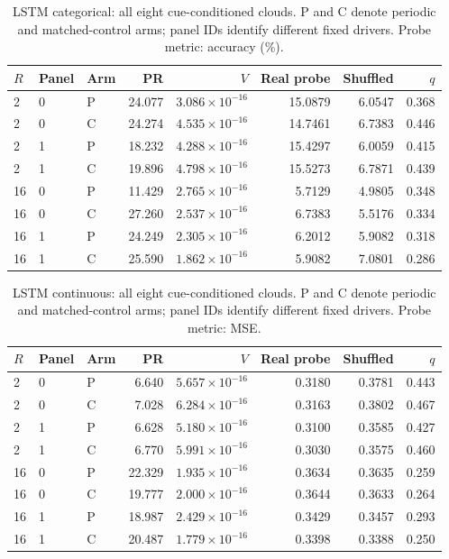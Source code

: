 \begin{table}[htbp]
\centering\footnotesize
\caption{LSTM categorical: all eight cue-conditioned clouds. P and C denote periodic and matched-control arms; panel IDs identify different fixed drivers. Probe metric: accuracy (\%).}
\label{tab:cloud-lstm-categorical}
\begin{tabular}{lllrrrrr}
\toprule
$R$ & Panel & Arm & PR & $V$ & Real probe & Shuffled & $q$ \\
\midrule
2 & 0 & P & 24.077 & $3.086\!\times\!10^{-16}$ & 15.0879 & 6.0547 & 0.368 \\
2 & 0 & C & 24.274 & $4.535\!\times\!10^{-16}$ & 14.7461 & 6.7383 & 0.446 \\
2 & 1 & P & 18.232 & $4.288\!\times\!10^{-16}$ & 15.4297 & 6.0059 & 0.415 \\
2 & 1 & C & 19.896 & $4.798\!\times\!10^{-16}$ & 15.5273 & 6.7871 & 0.439 \\
16 & 0 & P & 11.429 & $2.765\!\times\!10^{-16}$ & 5.7129 & 4.9805 & 0.348 \\
16 & 0 & C & 27.260 & $2.537\!\times\!10^{-16}$ & 6.7383 & 5.5176 & 0.334 \\
16 & 1 & P & 24.249 & $2.305\!\times\!10^{-16}$ & 6.2012 & 5.9082 & 0.318 \\
16 & 1 & C & 25.590 & $1.862\!\times\!10^{-16}$ & 5.9082 & 7.0801 & 0.286 \\
\bottomrule
\end{tabular}
\end{table}

\begin{table}[htbp]
\centering\footnotesize
\caption{LSTM continuous: all eight cue-conditioned clouds. P and C denote periodic and matched-control arms; panel IDs identify different fixed drivers. Probe metric: MSE.}
\label{tab:cloud-lstm-continuous}
\begin{tabular}{lllrrrrr}
\toprule
$R$ & Panel & Arm & PR & $V$ & Real probe & Shuffled & $q$ \\
\midrule
2 & 0 & P & 6.640 & $5.657\!\times\!10^{-16}$ & 0.3180 & 0.3781 & 0.443 \\
2 & 0 & C & 7.028 & $6.284\!\times\!10^{-16}$ & 0.3163 & 0.3802 & 0.467 \\
2 & 1 & P & 6.628 & $5.180\!\times\!10^{-16}$ & 0.3100 & 0.3585 & 0.427 \\
2 & 1 & C & 6.770 & $5.991\!\times\!10^{-16}$ & 0.3030 & 0.3575 & 0.460 \\
16 & 0 & P & 22.329 & $1.935\!\times\!10^{-16}$ & 0.3634 & 0.3635 & 0.259 \\
16 & 0 & C & 19.777 & $2.000\!\times\!10^{-16}$ & 0.3644 & 0.3633 & 0.264 \\
16 & 1 & P & 18.987 & $2.429\!\times\!10^{-16}$ & 0.3429 & 0.3457 & 0.293 \\
16 & 1 & C & 20.487 & $1.779\!\times\!10^{-16}$ & 0.3398 & 0.3388 & 0.250 \\
\bottomrule
\end{tabular}
\end{table}

